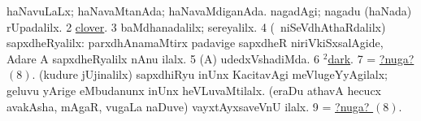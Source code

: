 \noindent
\gl{\nuga}
\bmng
\bnum
{}  
\banum
{} haNavuLaLx; haNavaMtanAda; haNavaMdiganAda. 
 nagadAgi; nagadu (haNada) rUpadalilx. 
\eanum
\numie
\num{2}  \hyperref{kandict_c.pdf}{C}{clover nuga}{clover}. 
\num{3}  baMdhanadalilx; sereyalilx. 
\num{4}  (\sA\ niSeVdhAthaRdalilx) sapxdheRyalilx:  parxdhAnamaMtirx padavige sapxdheR niriVkiSxsalAgide, Adare A sapxdheRyalilx nAnu ilalx. 
\num{5}   (A) udedxVshadiMda. 
\num{6}  \hyperref{kandict_d.pdf}{D}{dark(2) nuga(1)}{$^2$dark}. 
\num{7}  = \hyperlink{in nuga8}{?nuga? \((8)\)}. 
\hypertarget{in nuga8}{} 
  
\banum
{} (kudure jUjinalilx) sapxdhiRyu inUnx KacitavAgi meVlugeYyAgilalx; geluvu yArige eMbudanunx inUnx heVLuvaMtilalx. 
 (eraDu athavA hecucx avakAsha, mAgaR, \mo vugaLa naDuve) vayxtAyxsaveVnU ilalx. 
\eanum
\numie
\num{9}  = \hyperlink{in nuga8}{?nuga? \((8)\)}. 
\enum
\emng
\eentry

